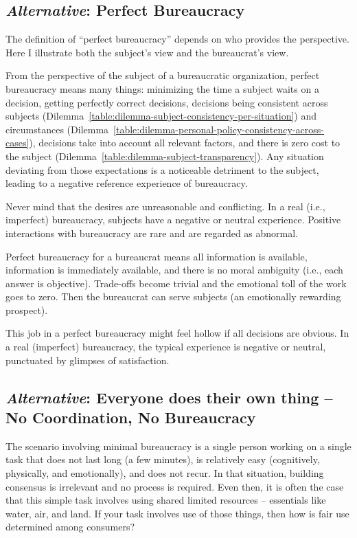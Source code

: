 \subsection*{\textit{Alternative}: Perfect Bureaucracy}

The definition of ``perfect bureaucracy'' depends on who provides the perspective. Here I illustrate both the subject's view and the bureaucrat's view. 

From the perspective of the subject of a bureaucratic organization, perfect bureaucracy means many things: minimizing the time a subject waits on a decision, getting perfectly correct decisions, decisions being consistent across subjects (Dilemma~\ref{table:dilemma-subject-consistency-per-situation})
and circumstances (Dilemma~\ref{table:dilemma-personal-policy-consistency-across-cases}), decisions take into account all relevant factors, and there is zero cost to the subject (Dilemma~\ref{table:dilemma-subject-transparency}). 
Any situation deviating from those expectations is a noticeable detriment to the subject, leading to a negative reference experience of bureaucracy. 

Never mind that the desires are unreasonable and conflicting. In a real (i.e., imperfect) bureaucracy, subjects have a negative or neutral experience. Positive interactions with bureaucracy are rare and are regarded as abnormal.

Perfect bureaucracy for a bureaucrat means all information is available, information is immediately available, and there is no moral ambiguity (i.e., each answer is objective). Trade-offs become trivial and the emotional toll of the work goes to zero. Then the bureaucrat can serve subjects (an emotionally rewarding prospect). 

This job in a perfect bureaucracy might feel hollow if all decisions are obvious. In a real (imperfect) bureaucracy, the typical experience is negative or neutral, punctuated by glimpses of satisfaction. 

\subsection*{\textit{Alternative}: Everyone does their own thing -- No Coordination, No Bureaucracy}
The scenario involving minimal bureaucracy is a single person working on a single task that does not last long (a few minutes), is relatively easy (cognitively, physically, and emotionally), and does not recur. In that situation, building consensus is irrelevant and no process is required. Even then, it is often the case that this simple task involves using shared limited resources --  essentials like water, air, and land. If your task involves use of those things, then how is fair use determined among consumers?

